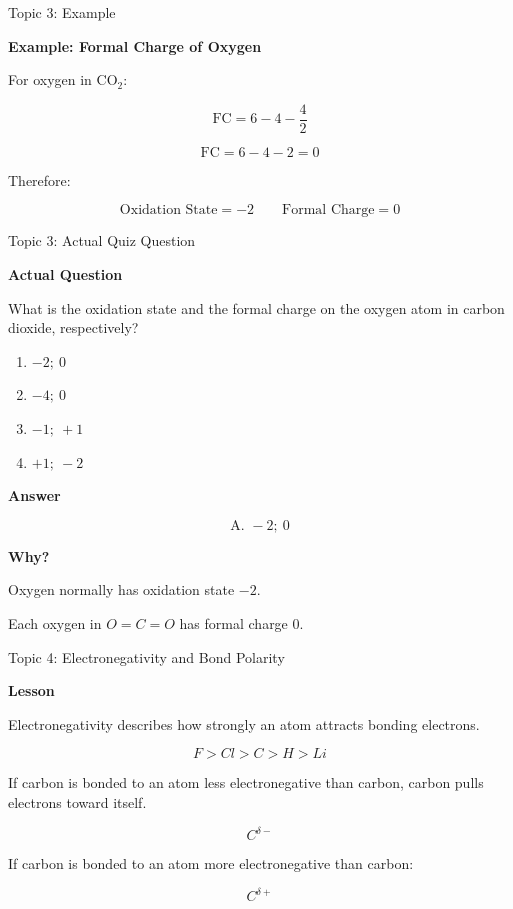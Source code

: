 \documentclass[aspectratio=169]{beamer}
\begin{document}
\begin{frame}[t]{Topic 3: Example}
\small

\textbf{Example: Formal Charge of Oxygen}

For oxygen in CO$_2$:

\[
\text{FC}
=
6-4-\frac{4}{2}
\]

\[
\text{FC}=6-4-2=0
\]

Therefore:

\[
\boxed{\text{Oxidation State}=-2}
\qquad
\boxed{\text{Formal Charge}=0}
\]

\end{frame}

\begin{frame}[t]{Topic 3: Actual Quiz Question}
\scriptsize

\textbf{Actual Question}

What is the oxidation state and the formal charge on the oxygen atom in carbon dioxide, respectively?

\vspace{0.08cm}

\begin{enumerate}
    \setlength{\itemsep}{0.04cm}
    \item[A.] $-2;\ 0$
    \item[B.] $-4;\ 0$
    \item[C.] $-1;\ +1$
    \item[D.] $+1;\ -2$
\end{enumerate}

\vspace{0.08cm}

\textbf{Answer}

\[
\boxed{\text{A. } -2;\ 0}
\]

\vspace{-0.12cm}

\textbf{Why?}

Oxygen normally has oxidation state $-2$.

Each oxygen in $O=C=O$ has formal charge $0$.

\end{frame}

\begin{frame}[t]{Topic 4: Electronegativity and Bond Polarity}
\small

\textbf{Lesson}

Electronegativity describes how strongly an atom attracts bonding electrons.

\[
F > Cl > C > H > Li
\]

If carbon is bonded to an atom less electronegative than carbon, carbon pulls electrons toward itself.

\[
C^{\delta-}
\]

If carbon is bonded to an atom more electronegative than carbon:

\[
C^{\delta+}
\]

\end{frame}
\end{document}

